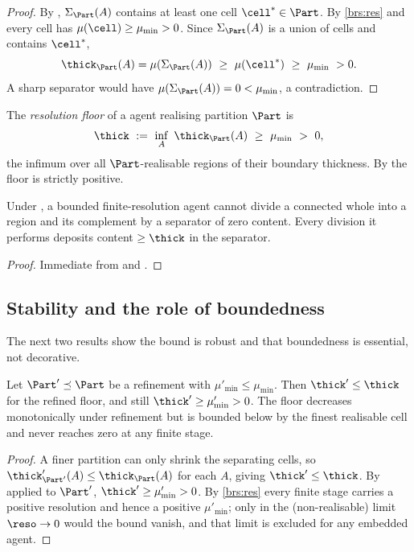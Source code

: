 \begin{proof}
By , $\Sigma_\Part(A)$ contains at least one cell
$\cell^\ast\in\Part$. By \ref{brs:res} and  every cell
has $\mu(\cell)\ge\mu_{\min}>0$. Since $\Sigma_\Part(A)$ is a union of cells and
contains $\cell^\ast$,
\[
\thick_\Part(A)=\mu(\Sigma_\Part(A))\ \ge\ \mu(\cell^\ast)\ \ge\ \mu_{\min}\ >0 .
\]
A sharp separator would have $\mu(\Sigma_\Part(A))=0<\mu_{\min}$, a
contradiction.
\end{proof}

\begin{definition}
\label{def:floor}
The \emph{resolution floor} of a agent realising partition $\Part$ is
\[
\thick\ :=\ \inf_{A}\ \thick_\Part(A)\ \ge\ \mu_{\min}\ >\ 0,
\]
the infimum over all $\Part$-realisable regions of their boundary thickness. By
 the floor is strictly positive.
\end{definition}

\begin{corollary}
\label{cor:no-zero-cut}
Under , a bounded finite-resolution agent cannot divide a
connected whole into a region and its complement by a separator of zero content.
Every division it performs deposits content $\ge\thick$ in the separator.
\end{corollary}

\begin{proof}
Immediate from  and .
\end{proof}

\subsection{Stability and the role of boundedness}

The next two results show the bound is robust and that boundedness is essential,
not decorative.

\begin{proposition}
\label{prop:refine}
Let $\Part'\preceq\Part$ be a refinement with $\mu'_{\min}\le\mu_{\min}$. Then
$\thick'\le\thick$ for the refined floor, and still $\thick'\ge\mu'_{\min}>0$.
The floor decreases monotonically under refinement but is bounded below by the
finest realisable cell and never reaches zero at any finite stage.
\end{proposition}

\begin{proof}
A finer partition can only shrink the separating cells, so
$\thick'_{\Part'}(A)\le\thick_\Part(A)$ for each $A$, giving $\thick'\le\thick$.
By  applied to $\Part'$, $\thick'\ge\mu'_{\min}>0$. By
\ref{brs:res} every finite stage carries a positive resolution and hence a
positive $\mu'_{\min}$; only in the (non-realisable) limit $\reso\to0$ would the
bound vanish, and that limit is excluded for any embedded agent.
\end{proof}

